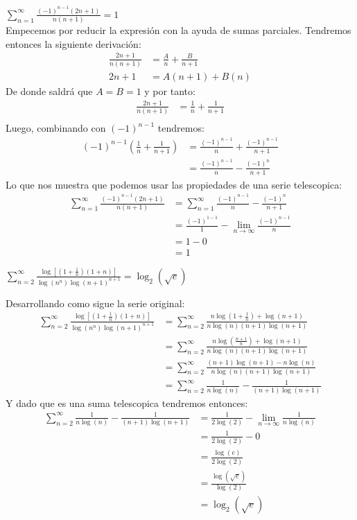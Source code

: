 \documentclass[../main.tex]{subfiles}
\begin{document}
\question $\sum\limits_{n = 1}^\infty \frac{(-1)^{n-1}(2n+1)}{n(n+1)} = 1$\\

Empecemos por reducir la expresión con la ayuda de sumas parciales. Tendremos entonces la siguiente derivación:
\begin{align*}
    \frac{2n+1}{n(n+1)} &= \frac{A}{n} + \frac{B}{n+1}\\
    2n+1 &= A(n+1)+B(n)
\end{align*}
De donde saldrá que $A = B = 1$ y por tanto:
\begin{align*}
    \frac{2n+1}{n(n+1)} &= \frac{1}{n} + \frac{1}{n+1}\\
\end{align*}
Luego, combinando con $(-1)^{n-1}$ tendremos:
\begin{align*}
    (-1)^{n-1}\left(\frac{1}{n} + \frac{1}{n+1}\right) &= \frac{(-1)^{n-1}}{n} + \frac{(-1)^{n-1}}{n+1}\\
    &= \frac{(-1)^{n-1}}{n} - \frac{(-1)^n}{n+1}
\end{align*}
Lo que nos muestra que podemos usar las propiedades de una serie telescopica:
\begin{align*}
    \sum\limits_{n = 1}^\infty \frac{(-1)^{n-1}(2n+1)}{n(n+1)} &= \sum\limits_{n = 1}^\infty \frac{(-1)^{n-1}}{n} - \frac{(-1)^n}{n+1}\\
    &= \frac{(-1)^{1-1}}{1} - \lim_{n \to \infty} \frac{(-1)^{n-1}}{n}\\
    &= 1 - 0\\
    &= 1
\end{align*}


\question $\sum\limits_{n = 2}^\infty \frac{\log\left[\left(1 + \frac{1}{n}\right)(1+n)\right]}{\log(n^n) \log(n+1)^{n+1}} = \log_{2}(\sqrt{e})$

Desarrollando como sigue la serie original:
\begin{align*}
    \sum_{n = 2}^\infty \frac{\log\left[\left(1 + \frac{1}{n}\right)(1+n)\right]}{\log(n^n) \log(n+1)^{n+1}} &= \sum_{n =2}^\infty \frac{n \log\left(1+\frac{1}{n}\right) + \log(n+1)}{n \log(n) (n+1) \log(n+1)}\\
    &= \sum_{n = 2}^\infty \frac{n \log\left(\frac{n+1}{n}\right) + \log(n+1)}{n \log(n) (n+1) \log(n+1)}\\
    &= \sum_{n = 2}^\infty \frac{(n+1)\log(n+1) - n\log(n)}{n \log(n) (n+1) \log(n+1)}\\
    &= \sum_{n = 2}^\infty \frac{1}{n \log(n)} - \frac{1}{(n+1)\log(n+1)}
\end{align*}
Y dado que es una suma telescopica tendremos entonces:
\begin{align*}
    \sum_{n = 2}^\infty \frac{1}{n \log(n)} - \frac{1}{(n+1)\log(n+1)} &= \frac{1}{2 \log(2)} - \lim_{n \to \infty} \frac{1}{n \log(n)}\\
    &= \frac{1}{2 \log(2)} - 0\\
    &= \frac{\log(e)}{2 \log(2)}\\
    &= \frac{\log(\sqrt{e})}{\log(2)}\\
    &= \log_{2}(\sqrt{e})
\end{align*}
\end{document}
